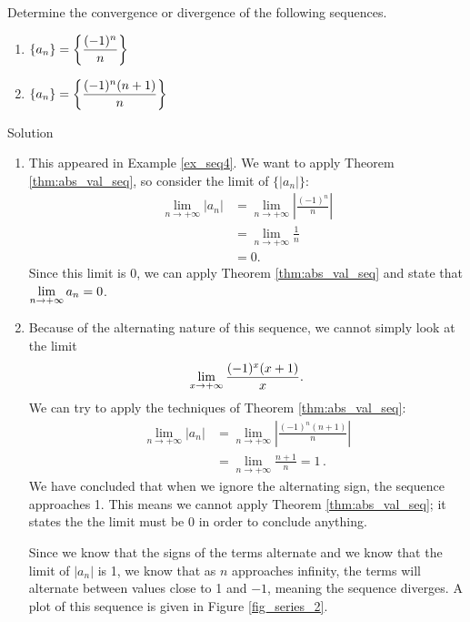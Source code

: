 \fi
\begin{example}\label{ex_seq5}
Determine the convergence or divergence of the following sequences.
\begin{multicols}{2}
\begin{enumerate}
\item $\displaystyle \{a_n\} = \left\{\frac{(-1)^n}{n}\right\}$ 
\item $\displaystyle \{a_n\} = \left\{\frac{(-1)^n(n+1)}{n}\right\}$ 
\end{enumerate}
\end{multicols}

Solution 

\begin{enumerate}
\item		This appeared in Example \ref{ex_seq4}. We want to apply Theorem \ref{thm:abs_val_seq}, so consider the limit of $\{|a_n|\}$:
\begin{align*}
\lim_{n\to+\infty} |a_n| &= \lim_{n\to+\infty} \left|\frac{(-1)^n}{n}\right| \\[0.2cm]
					&= \lim_{n\to+\infty} \frac{1}{n} \\
					&= 0.
\end{align*}
Since this limit is 0, we can apply Theorem \ref{thm:abs_val_seq} and state that $\displaystyle\lim_{n\to+\infty} a_n=0$.

\item Because of the alternating nature of this sequence, we cannot simply look at the limit 
$$\displaystyle \lim_{x\to+\infty} \frac{(-1)^x(x+1)}{x}.$$
We can try to apply the techniques of Theorem \ref{thm:abs_val_seq}:
\begin{align*}
\lim_{n\to+\infty} |a_n| &= \lim_{n\to+\infty} \left|\frac{(-1)^n(n+1)}{n}\right| \\[0.2cm]
							&= \lim_{n\to+\infty} \frac{n+1}{n}=1\,.
							\end{align*}
We have concluded that when we ignore the alternating sign, the sequence approaches 1. This means we cannot apply Theorem \ref{thm:abs_val_seq}; it states the the limit must be 0 in order to conclude anything.

Since we know that the signs of the terms alternate and we know that the limit of $|a_n|$ is 1, we know that as $n$ approaches infinity, the terms will alternate between values close to 1 and $-1$, meaning the sequence diverges. A plot of this sequence is given in Figure \ref{fig_series_2}.
\end{enumerate}


\end{example}
